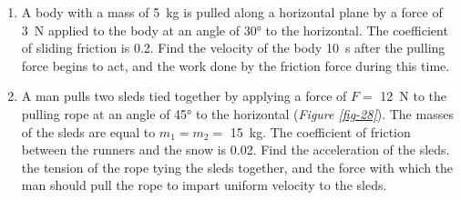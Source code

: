 \documentclass[a4paper,sfsidenotes]{tufte-book}
\begin{document}
\begin{enumerate}[resume*=problems]
\item A body with a mass of \SI{5}{kg} is pulled along a horizontal plane by a force of \SI{3}{\newton} applied to the body at an angle of \ang{30} to the horizontal. The coefficient of sliding friction is 0.2. Find the velocity of the body \SI{10}{\second} after the pulling force begins to act, and the work done by the friction force during this time.

\item A man pulls two sleds tied together by applying a force of $F=$ \SI{12}{\newton} to the pulling rope at an angle of \ang{45} to the horizontal (\emph{Figure \ref{fig-28}}). The masses of the sleds are equal to $m_{1}=m_{2}=$ \SI{15}{\kilogram}. The coefficient of friction between the runners and the snow is 0.02. Find the acceleration of the sleds. the tension of the rope tying the sleds together, and the force with which the man should pull the rope to impart uniform velocity to the sleds.


\end{enumerate}
\end{document}
